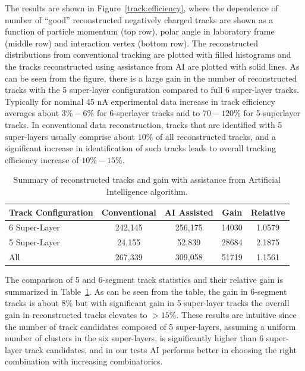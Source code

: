 The results are shown in Figure~\ref{track:efficiency}, where the dependence of number 
of ``good'' reconstructed negatively charged tracks are shown as a function of particle 
momentum (top row), polar angle in laboratory frame (middle row) and interaction vertex 
(bottom row). The reconstructed distributions from conventional tracking are plotted with 
filled histograms and the tracks reconstructed using assistance from AI are plotted with 
solid lines. As can be seen from the figure, there is a large gain in the number of reconstructed 
tracks with the 5 super-layer configuration compared to full 6 super-layer tracks. Typically 
for nominal 45 nA experimental data increase in track efficiency averages about $3\%-6\%$ 
for 6-sperlayer tracks and to $70-120\%$ for 5-superlayer tracks. In conventional data 
reconstruction, tracks that are identified with 5 super-layers usually comprise about $10\%$ 
of all reconstructed tracks, and a significant increase in identification of such tracks leads to 
overall tracking efficiency increase of $10\%-15\%$. 
 
 \begin{table}[!h]
 \begin{center}
 \begin{tabular}{|l|c|c|c|c|}
 \hline
 Track Configuration & Conventional & AI Assisted & Gain & Relative \\
 \hline
 \hline
 6 Super-Layer & 242,145 & 256,175 & 14030 & 1.0579 \\
 5 Super-Layer & 24,155 & 52,839 & 28684 & 2.1875 \\
 All & 267,339 & 309,058 & 51719 & 1.1561 \\
 \hline
 \end{tabular}
 \end{center}
 \caption{Summary of reconstructed tracks and gain with assistance from Artificial Intelligence algorithm.}
 \label{tbl:summary}
 \end{table}
 
The comparison of 5 and 6-segment track statistics and their relative gain is 
summarized in Table~\ref{tbl:summary}. As can be seen from the table, the 
gain in 6-segment tracks is about $8\%$ but with significant gain in 5 super-layer tracks 
the overall gain in reconstructed tracks elevates to $>15\%$. These results are intuitive 
since the number of track candidates composed of 5 super-layers, assuming a uniform 
number of clusters in the six super-layers, is significantly higher than 6 super-layer track 
candidates, and in our tests AI performs better in choosing the right combination with 
increasing combinatorics.
 
